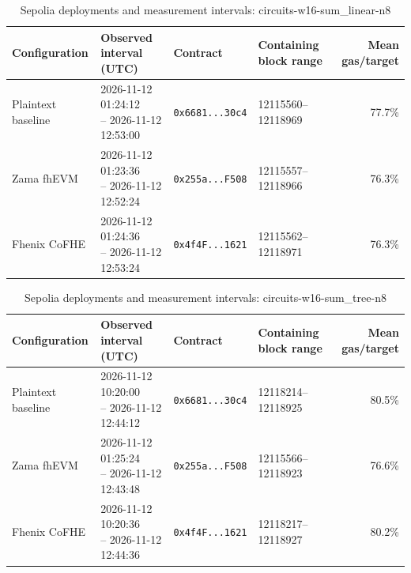 \begin{table}[!t]
\caption{Sepolia deployments and measurement intervals: circuits-w16-sum\_linear-n8}
\label{tab:sepolia-circuits-w16-sum-linear-n8}
\centering
\footnotesize
\setlength{\tabcolsep}{4pt}
\begin{tabular}{|l|l|l|l|r|}
\hline
\textbf{Configuration} & \textbf{Observed interval (UTC)} & \textbf{Contract} & \textbf{Containing block range} & \textbf{Mean gas/target} \\
\hline
Plaintext baseline & \shortstack[l]{2026-11-12 01:24:12 \\ -- 2026-11-12 12:53:00} & \texttt{0x6681...30c4} & 12115560--12118969 & 77.7\% \\
\hline
Zama fhEVM & \shortstack[l]{2026-11-12 01:23:36 \\ -- 2026-11-12 12:52:24} & \texttt{0x255a...F508} & 12115557--12118966 & 76.3\% \\
\hline
Fhenix CoFHE & \shortstack[l]{2026-11-12 01:24:36 \\ -- 2026-11-12 12:53:24} & \texttt{0x4f4F...1621} & 12115562--12118971 & 76.3\% \\
\hline
\end{tabular}
\end{table}

\begin{table}[!t]
\caption{Sepolia deployments and measurement intervals: circuits-w16-sum\_tree-n8}
\label{tab:sepolia-circuits-w16-sum-tree-n8}
\centering
\footnotesize
\setlength{\tabcolsep}{4pt}
\begin{tabular}{|l|l|l|l|r|}
\hline
\textbf{Configuration} & \textbf{Observed interval (UTC)} & \textbf{Contract} & \textbf{Containing block range} & \textbf{Mean gas/target} \\
\hline
Plaintext baseline & \shortstack[l]{2026-11-12 10:20:00 \\ -- 2026-11-12 12:44:12} & \texttt{0x6681...30c4} & 12118214--12118925 & 80.5\% \\
\hline
Zama fhEVM & \shortstack[l]{2026-11-12 01:25:24 \\ -- 2026-11-12 12:43:48} & \texttt{0x255a...F508} & 12115566--12118923 & 76.6\% \\
\hline
Fhenix CoFHE & \shortstack[l]{2026-11-12 10:20:36 \\ -- 2026-11-12 12:44:36} & \texttt{0x4f4F...1621} & 12118217--12118927 & 80.2\% \\
\hline
\end{tabular}
\end{table}

